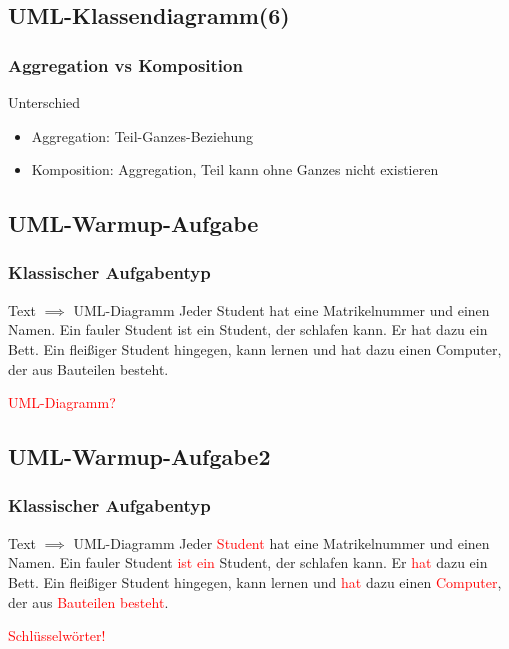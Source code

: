\documentclass[18pt]{beamer}
\begin{document}
	\subsection{UML-Klassendiagramm(6)}
	\begin{frame}
		\frametitle{Aggregation vs Komposition}
		\begin{alertblock}{Unterschied}
			\begin{itemize}
				\item Aggregation: Teil-Ganzes-Beziehung
				\item Komposition: Aggregation, Teil kann ohne Ganzes nicht existieren
			\end{itemize}
		\end{alertblock}
	\end{frame}

	\subsection{UML-Warmup-Aufgabe}
	\begin{frame}
		\frametitle{Klassischer Aufgabentyp}
		\begin{exampleblock}{Text $\implies$ UML-Diagramm}
			Jeder Student hat eine Matrikelnummer und einen Namen. Ein fauler Student ist ein Student, der schlafen kann. Er hat dazu ein Bett. Ein fleißiger Student hingegen, kann lernen und hat dazu einen Computer, der aus Bauteilen besteht.
		\end{exampleblock}
	\pause
	\textcolor{red}{UML-Diagramm?}
\end{frame}

	\subsection{UML-Warmup-Aufgabe2}
	\begin{frame}
	\frametitle{Klassischer Aufgabentyp}
	\begin{exampleblock}{Text $\implies$ UML-Diagramm}
		Jeder \textcolor{red}{Student} hat eine Matrikelnummer und einen Namen. Ein fauler Student \textcolor{red}{ist ein} Student, der schlafen kann. Er \textcolor{red}{hat} dazu ein Bett. Ein fleißiger Student hingegen, kann lernen und \textcolor{red}{hat} dazu einen \textcolor{red}{Computer}, der aus \textcolor{red}{Bauteilen} \textcolor{red}{besteht}.
	\end{exampleblock}
	\textcolor{red}{Schlüsselwörter!}
\end{frame}
	
\end{document}

